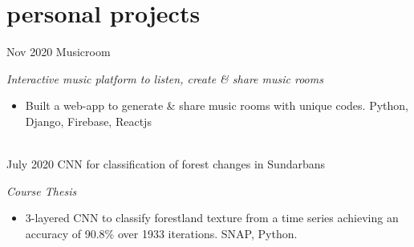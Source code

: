 \section*{personal projects}
\begin{entrylist}
	\entry
	{Nov 2020}
	{Musicroom}{}
	{\emph{Interactive music platform to listen, create \& share music rooms}
		\begin{itemize}
			\item Built a web-app to generate \& share music rooms with unique codes. Python, Django, Firebase, Reactjs
		\end{itemize}
	}
	\ \\
	\entry
	{July 2020}
	{CNN for classification of forest changes in Sundarbans}
	{}
	{\emph{Course Thesis}
		\begin{itemize}
			\item 3-layered CNN to classify forestland texture from a time series achieving an accuracy of 90.8\% over 1933 iterations. SNAP, Python.
		\end{itemize}
	}
\end{entrylist}

